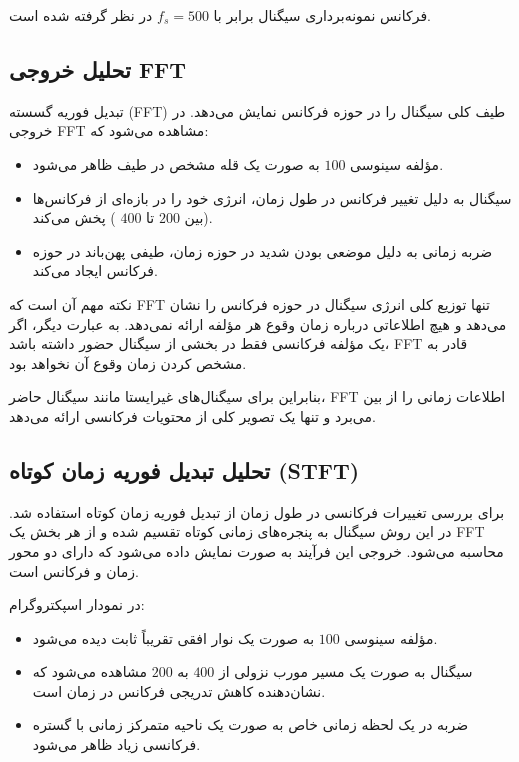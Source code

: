 \documentclass[12pt]{article}
\begin{document}
	فرکانس نمونه‌برداری سیگنال برابر با $f_s = 500$  در نظر گرفته شده است.
	
	\subsection{تحلیل خروجی FFT}
	
	تبدیل فوریه گسسته (FFT) طیف کلی سیگنال را در حوزه فرکانس نمایش می‌دهد. در خروجی FFT مشاهده می‌شود که:
	
	\begin{itemize}
		\item مؤلفه سینوسی $100$  به صورت یک قله مشخص در طیف ظاهر می‌شود.
		\item سیگنال  به دلیل تغییر فرکانس در طول زمان، انرژی خود را در بازه‌ای از فرکانس‌ها (بین $200$ تا $400$ ) پخش می‌کند.
		\item ضربه زمانی به دلیل موضعی بودن شدید در حوزه زمان، طیفی پهن‌باند در حوزه فرکانس ایجاد می‌کند.
	\end{itemize}
	
	نکته مهم آن است که FFT تنها توزیع کلی انرژی سیگنال در حوزه فرکانس را نشان می‌دهد و هیچ اطلاعاتی درباره زمان وقوع هر مؤلفه ارائه نمی‌دهد. به عبارت دیگر، اگر یک مؤلفه فرکانسی فقط در بخشی از سیگنال حضور داشته باشد، FFT قادر به مشخص کردن زمان وقوع آن نخواهد بود.
	
	بنابراین برای سیگنال‌های غیرایستا مانند سیگنال حاضر، FFT اطلاعات زمانی را از بین می‌برد و تنها یک تصویر کلی از محتویات فرکانسی ارائه می‌دهد.
	
	\subsection{تحلیل تبدیل فوریه زمان کوتاه (STFT)}
	
	برای بررسی تغییرات فرکانسی در طول زمان از تبدیل فوریه زمان کوتاه استفاده شد. در این روش سیگنال به پنجره‌های زمانی کوتاه تقسیم شده و از هر بخش یک FFT محاسبه می‌شود. خروجی این فرآیند به صورت  نمایش داده می‌شود که دارای دو محور زمان و فرکانس است.
	
	در نمودار اسپکتروگرام:
	
	\begin{itemize}
		\item مؤلفه سینوسی $100$  به صورت یک نوار افقی تقریباً ثابت دیده می‌شود.
		\item سیگنال  به صورت یک مسیر مورب نزولی از $400$  به $200$  مشاهده می‌شود که نشان‌دهنده کاهش تدریجی فرکانس در زمان است.
		\item ضربه در یک لحظه زمانی خاص به صورت یک ناحیه متمرکز زمانی با گستره فرکانسی زیاد ظاهر می‌شود.
	\end{itemize}
	
\end{document}
